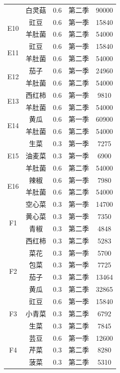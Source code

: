 \begin{longtable}{ccccc}
 & 白灵菇 & 0.6 & 第二季 & 90000 \\
\multirow{2}{*}{E10} & 豇豆 & 0.6 & 第一季 & 15840 \\
 & 羊肚菌 & 0.6 & 第二季 & 54000 \\
\multirow{2}{*}{E11} & 豇豆 & 0.6 & 第一季 & 15840 \\
 & 羊肚菌 & 0.6 & 第二季 & 54000 \\
\multirow{2}{*}{E12} & 茄子 & 0.6 & 第一季 & 24960 \\
 & 羊肚菌 & 0.6 & 第二季 & 54000 \\
\multirow{2}{*}{E13} & 西红柿 & 0.6 & 第一季 & 9810 \\
 & 羊肚菌 & 0.6 & 第二季 & 54000 \\
\multirow{2}{*}{E14} & 黄瓜 & 0.6 & 第一季 & 60900 \\
 & 羊肚菌 & 0.6 & 第二季 & 54000 \\
\multirow{3}{*}{E15} & 生菜 & 0.3 & 第一季 & 7275 \\
 & 油麦菜 & 0.3 & 第一季 & 6900 \\
 & 羊肚菌 & 0.6 & 第二季 & 54000 \\
\multirow{2}{*}{E16} & 辣椒 & 0.6 & 第一季 & 7980 \\
 & 羊肚菌 & 0.6 & 第二季 & 54000 \\
\multirow{4}{*}{F1} & 空心菜 & 0.3 & 第一季 & 14700 \\
 & 黄心菜 & 0.3 & 第一季 & 7350 \\
 & 青椒 & 0.3 & 第二季 & 4848 \\
 & 西红柿 & 0.3 & 第二季 & 5283 \\
\multirow{4}{*}{F2} & 菜花 & 0.3 & 第一季 & 5700 \\
 & 包菜 & 0.3 & 第一季 & 7725 \\
 & 茄子 & 0.3 & 第二季 & 13464 \\
 & 黄瓜 & 0.3 & 第二季 & 32865 \\
\multirow{3}{*}{F3} & 豇豆 & 0.6 & 第一季 & 15840 \\
 & 小青菜 & 0.3 & 第二季 & 6792 \\
 & 生菜 & 0.3 & 第二季 & 7845 \\
\multirow{3}{*}{F4} & 芸豆 & 0.6 & 第一季 & 12600 \\
 & 芹菜 & 0.3 & 第二季 & 8280 \\
 & 菠菜 & 0.3 & 第二季 & 5310 \\
\bottomrule
\end{longtable}
